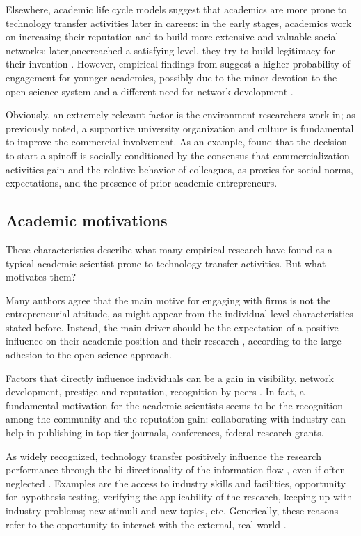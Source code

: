 Elsewhere, academic life cycle models suggest that academics are more prone to technology transfer activities later in careers: in the early stages, academics work on increasing their reputation and to build more extensive and valuable social networks; later,oncereached a satisfying level, they try to build legitimacy for their invention \citet{Fini2009}. However, empirical findings from \citet{DEste2007} suggest a higher probability of engagement for younger academics, possibly due to the minor devotion to the open science system and a different need for network development \citep{Bercovitz2006}.

Obviously, an extremely relevant factor is the environment researchers work in; as previously noted, a supportive university organization and culture is fundamental to improve the commercial involvement. As an example, \citet{OShea2004} found that the decision to start a spinoff is socially conditioned by the consensus that commercialization activities gain and the relative behavior of colleagues, as proxies for social norms, expectations, and the presence of prior academic entrepreneurs. 

\subsection{Academic motivations}

These characteristics describe what many empirical research have found as a typical academic scientist prone to technology transfer activities. But what motivates them? 

Many authors agree that the main motive for engaging with firms is not the entrepreneurial attitude, as might appear from the individual-level characteristics stated before. Instead, the main driver should be the expectation of a positive influence on their academic position and their research \citep{Fini2009, DEste2011}, according to the large adhesion to the open science approach.

Factors that directly influence individuals can be a gain in visibility, network development, prestige and reputation, recognition by peers \citep{Baldini2007, Fini2009, Rizzo2015}. In fact, a fundamental motivation for the academic scientists seems to be the recognition among the community and the reputation gain: collaborating with industry can help in publishing in top-tier journals, conferences, federal research grants.

As widely recognized, technology transfer positively influence the research performance through the bi-directionality of the information flow \citep{Geuna2009}, even if often neglected \citep{DEste2007}. Examples are the access to industry skills and facilities, opportunity for hypothesis testing, verifying the applicability of the research, keeping up with industry problems; new stimuli and new topics, etc. Generically, these reasons refer to the opportunity to interact with the external, real world \citep{Baldini2007}. 

